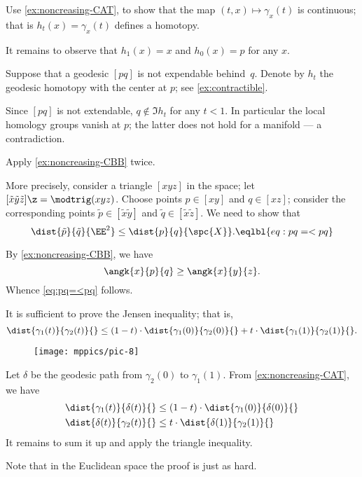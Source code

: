 Use \ref{ex:noncreasing-CAT}, to show that the map $(t,x)\mapsto \gamma_x(t)$ is continuous; that is $h_t(x)=\gamma_x(t)$ defines a homotopy.

It remains to observe that $h_1(x)=x$ and $h_0(x)=p$ for any $x$.

Suppose that a geodesic $[pq]$ is not expendable behind~$q$.
Denote by $h_t$ the geodesic homotopy with the center at $p$; see \ref{ex:contractible}.

Since $[pq]$ is not extendable, $q\notin \Im h_t$ for any $t<1$.
In particular the local homology groups vanish at $p$;
the latter does not hold for a manifold --- a contradiction.

Apply \ref{ex:noncreasing-CBB} twice.

More precisely, consider a triangle $[xyz]$ in the space; let $[\tilde x\tilde y\tilde z]\z=\modtrig(xyz)$.
Choose points $p\in[xy]$ and $q\in[xz]$;
consider the corresponding points $\tilde p\in[\tilde x\tilde y]$ and $\tilde q\in[\tilde x\tilde z]$.
We need to show that 
\[\dist{\tilde p}{\tilde q}{\EE^2}\le \dist{ p}{q}{\spc{X}}.
\eqlbl{eq:pq=<pq}\]

By \ref{ex:noncreasing-CBB}, we have
\[\angk{x}{p}{q}\ge\angk{x}{y}{z}.\]
Whence \ref{eq:pq=<pq} follows.


It is sufficient to prove the Jensen inequality;
that is, 
\[
\dist{\gamma_1(t)}{\gamma_2(t)}{}
\le
(1-t)\cdot\dist{\gamma_1(0)}{\gamma_2(0)}{}
+
t\cdot \dist{\gamma_1(1)}{\gamma_2(1)}{}.
\]

{

\begin{wrapfigure}{o}{45 mm}
\vskip-4mm
\centering
\texttt{[image: mppics/pic-8]}
\end{wrapfigure}

Let $\delta$ be the geodesic path from $\gamma_2(0)$ to $\gamma_1(1)$.
From \ref{ex:noncreasing-CAT}, we have
\begin{align*}
\dist{\gamma_1(t)}{\delta(t)}{}
&\le
(1-t)\cdot\dist{\gamma_1(0)}{\delta(0)}{}
\\
\dist{\delta(t)}{\gamma_2(t)}{}
&\le
t\cdot\dist{\delta(1)}{\gamma_2(1)}{}
\end{align*}
It remains to sum it up and apply the triangle inequality.

}

 Note that in the Euclidean space the proof is just as hard.

